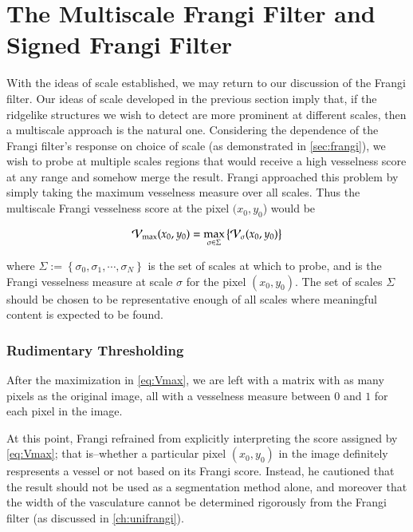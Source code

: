  \chapter{The Multiscale Frangi Filter and Signed Frangi Filter} \label{ch:multifrangi}
    
     With the ideas of scale established, we may return to our discussion of the Frangi filter.
    Our ideas of scale developed in the previous section imply that, if the ridgelike structures we wish to detect are more prominent at different scales, then a multiscale approach is the natural one. Considering the dependence of the Frangi filter's response on choice of scale (as demonstrated in \cref{sec:frangi}), we wish to probe at multiple scales
    regions that would receive a high vesselness score at any range and somehow merge the result. Frangi \cite{frangi-paper} approached this problem by simply taking the maximum vesselness measure over all scales. Thus the multiscale Frangi vesselness score at the pixel $(x_0, y_0$) would be 
    
    \begin{equation} \label{eq:Vmax}
    \mathcal{V}_{\max}(x_0, y_0) =
    	\underset{\sigma \in \Sigma}{\max}\left\{  \mathcal{V}_{\sigma} (x_0, y_0) \right\}
    \end{equation}
    
    where $\Sigma := \left\{ \sigma_0, \sigma_1 , \cdots, \sigma_N \right\}$ is
    the set of scales at which to probe, and \Vsigma is the Frangi vesselness measure at scale $\sigma$ for the pixel $(x_0,y_0)$. The set of scales $\Sigma$ should be chosen to be representative enough of all scales where meaningful content is expected to be found.
    
   
    \subsection{Rudimentary Thresholding}
    
    After the maximization in \cref{eq:Vmax}, we are left with a matrix with as many pixels as the original image, all with a vesselness measure between $0$ and $1$ for each pixel in the image.
         
    At this point, Frangi \cite{frangi-paper} refrained from explicitly interpreting the score assigned by \cref{eq:Vmax}; that is--whether a particular pixel $(x_0,y_0)$ in the image definitely respresents a vessel or not based on its Frangi score. Instead, he cautioned that the result should not be used as a segmentation method alone, and moreover that the width of the vasculature cannot be determined rigorously from the Frangi filter (as discussed in \cref{ch:unifrangi}).
   
